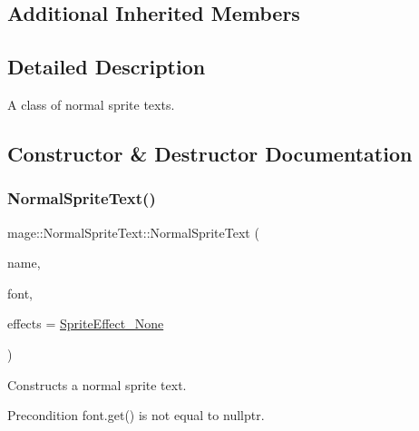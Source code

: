 \subsection*{Additional Inherited Members}


\subsection{Detailed Description}
A class of normal sprite texts. 

\subsection{Constructor \& Destructor Documentation}
\hypertarget{classmage_1_1_normal_sprite_text_af91e5d22a02044c4159eefdc161c5dec}{}\label{classmage_1_1_normal_sprite_text_af91e5d22a02044c4159eefdc161c5dec} 
\subsubsection{\texorpdfstring{Normal\+Sprite\+Text()}{NormalSpriteText()}\hspace{0.1cm}{\footnotesize\ttfamily [1/3]}}
{\footnotesize\ttfamily mage\+::\+Normal\+Sprite\+Text\+::\+Normal\+Sprite\+Text (\begin{DoxyParamCaption}\item[{const string \&}]{name,  }\item[{\hyperlink{namespacemage_a1e01ae66713838a7a67d30e44c67703e}{Shared\+Ptr}$<$ \hyperlink{classmage_1_1_sprite_font}{Sprite\+Font} $>$}]{font,  }\item[{\hyperlink{namespacemage_a9cfe18123066ba4236f548f9de75d881}{Sprite\+Effect}}]{effects = {\ttfamily \hyperlink{namespacemage_a9cfe18123066ba4236f548f9de75d881af3c275fbfacfe174da928b2f24dfa515}{Sprite\+Effect\+\_\+\+None}} }\end{DoxyParamCaption})\hspace{0.3cm}{\ttfamily [explicit]}}

Constructs a normal sprite text.

\begin{DoxyPrecond}{Precondition}
{\ttfamily font.\+get()} is not equal to {\ttfamily nullptr}. 
\end{DoxyPrecond}

